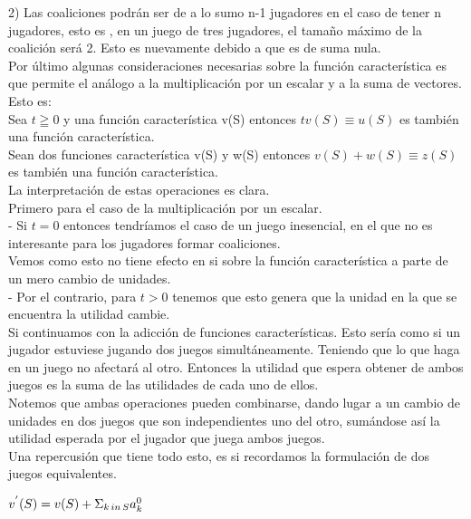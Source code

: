 \documentclass[10pt,a4paper]{book}
\begin{document}
2) Las coaliciones podrán ser de a lo sumo n-1 jugadores en el caso de tener n jugadores, esto es , en un juego de tres jugadores, el tamaño máximo de la coalición será 2. Esto es nuevamente debido a que es de suma nula.\\

Por último algunas consideraciones necesarias sobre la función característica es que permite el análogo a la multiplicación por un escalar y a la suma de vectores. Esto es:\\

Sea $t \geqq 0$ y una función característica v(S) entonces $ tv(S) \equiv u(S)$ es también una función característica.\\

Sean dos funciones característica v(S) y w(S) entonces $v(S) + w(S) \equiv z(S)$ es también una función característica.\\


La interpretación de estas operaciones es clara. \\
Primero para el caso de la multiplicación por un escalar.\\
	- Si $t=0$ entonces tendríamos el caso de un juego inesencial, en el que no es interesante para los jugadores formar coaliciones.\\
	Vemos como esto no tiene efecto en si sobre la función característica a parte de un mero cambio de unidades.\\
	- Por el contrario, para $t >0 $ tenemos que esto genera que la unidad en la que se encuentra la utilidad cambie.\\

Si continuamos con la adicción de funciones características. Esto sería como si un jugador estuviese jugando dos juegos simultáneamente. Teniendo que lo que haga en un juego no afectará al otro. Entonces la utilidad que espera obtener de ambos juegos es la suma de las utilidades de cada uno de ellos.\\

Notemos que ambas operaciones pueden combinarse, dando lugar a un cambio de unidades en dos juegos que son independientes uno del otro, sumándose así la utilidad esperada por el jugador que juega ambos juegos. \\


Una repercusión que tiene todo esto, es si recordamos la formulación de dos juegos equivalentes. 


\begin{center}

$v^{'}(S)=v(S)+ \Sigma_{k \thinspace  in \thinspace S}a^0_k$

\end{center}
\end{document}
